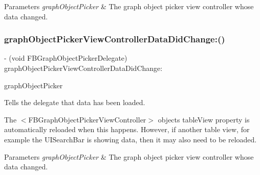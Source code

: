 \begin{DoxyParams}{Parameters}
{\em graph\+Object\+Picker} & The graph object picker view controller whose data changed. \\
\hline
\end{DoxyParams}
\mbox{\label{protocolFBGraphObjectPickerDelegate_01-p_a7444276f3c20567235206a1be36074cb}} 
\subsubsection{\texorpdfstring{graph\+Object\+Picker\+View\+Controller\+Data\+Did\+Change\+:()}{graphObjectPickerViewControllerDataDidChange:()}\hspace{0.1cm}{\footnotesize\ttfamily [5/5]}}
{\footnotesize\ttfamily -\/ (void F\+B\+Graph\+Object\+Picker\+Delegate) graph\+Object\+Picker\+View\+Controller\+Data\+Did\+Change\+: \begin{DoxyParamCaption}\item[{(\hyperlink{interfaceFBGraphObjectPickerViewController}{F\+B\+Graph\+Object\+Picker\+View\+Controller} $\ast$)}]{graph\+Object\+Picker }\end{DoxyParamCaption}\hspace{0.3cm}{\ttfamily [optional]}}

Tells the delegate that data has been loaded.

The $<$\+F\+B\+Graph\+Object\+Picker\+View\+Controller$>$ object\textquotesingle{}s {\ttfamily table\+View} property is automatically reloaded when this happens. However, if another table view, for example the {\ttfamily U\+I\+Search\+Bar} is showing data, then it may also need to be reloaded.


\begin{DoxyParams}{Parameters}
{\em graph\+Object\+Picker} & The graph object picker view controller whose data changed. \\
\hline
\end{DoxyParams}
\mbox{\label{protocolFBGraphObjectPickerDelegate_01-p_a7c9da228bb329ef648df31794c7c7113}} 
